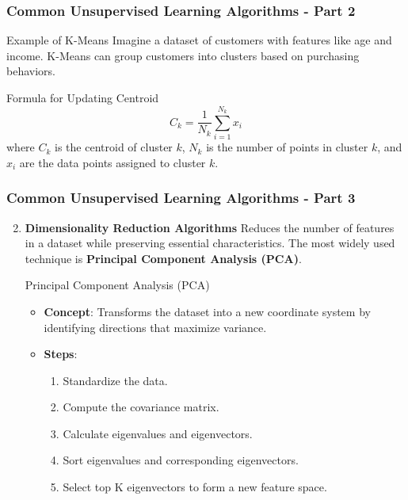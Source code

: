 \documentclass{beamer}
\begin{document}
\begin{frame}[fragile]
    \frametitle{Common Unsupervised Learning Algorithms - Part 2}
    \begin{block}{Example of K-Means}
        Imagine a dataset of customers with features like age and income. K-Means can group customers into clusters based on purchasing behaviors.
    \end{block}
    
    \begin{block}{Formula for Updating Centroid}
        \begin{equation}
            C_k = \frac{1}{N_k} \sum_{i=1}^{N_k} x_i
        \end{equation}
        where \( C_k \) is the centroid of cluster \( k \), \( N_k \) is the number of points in cluster \( k \), and \( x_i \) are the data points assigned to cluster \( k \).
    \end{block}
\end{frame}

\begin{frame}[fragile]
    \frametitle{Common Unsupervised Learning Algorithms - Part 3}
    \begin{enumerate}
        \setcounter{enumi}{1}
        \item \textbf{Dimensionality Reduction Algorithms}  
        Reduces the number of features in a dataset while preserving essential characteristics. The most widely used technique is \textbf{Principal Component Analysis (PCA)}.
        
        \begin{block}{Principal Component Analysis (PCA)}
            \begin{itemize}
                \item \textbf{Concept}: Transforms the dataset into a new coordinate system by identifying directions that maximize variance.
                \item \textbf{Steps}:
                \begin{enumerate}
                    \item Standardize the data.
                    \item Compute the covariance matrix.
                    \item Calculate eigenvalues and eigenvectors.
                    \item Sort eigenvalues and corresponding eigenvectors.
                    \item Select top K eigenvectors to form a new feature space.
                \end{enumerate}
            \end{itemize}
        \end{block}
    \end{enumerate}
\end{frame}
\end{document}
